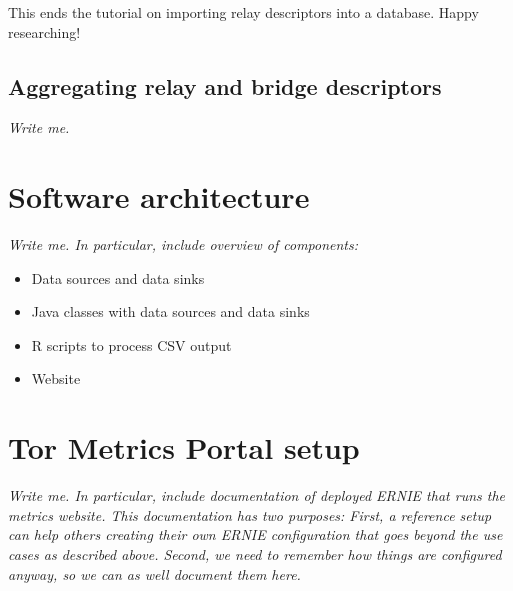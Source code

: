 \documentclass{article}
\begin{document}
This ends the tutorial on importing relay descriptors into a database.
Happy researching!

\subsection{Aggregating relay and bridge descriptors}

{\it Write me.}

\section{Software architecture}

{\it Write me. In particular, include overview of components:

\begin{itemize}
\item Data sources and data sinks
\item Java classes with data sources and data sinks
\item R scripts to process CSV output
\item Website
\end{itemize}
}

\section{Tor Metrics Portal setup}

{\it
Write me. In particular, include documentation of deployed ERNIE that
runs the metrics website.
This documentation has two purposes:
First, a reference setup can help others creating their own ERNIE
configuration that goes beyond the use cases as described above.
Second, we need to remember how things are configured anyway, so we can
as well document them here.}
\end{document}
